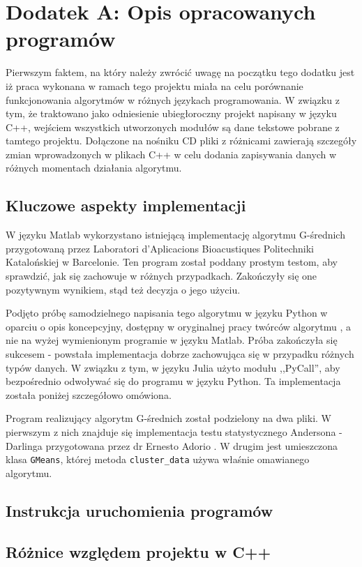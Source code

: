 \section*{Dodatek A: Opis opracowanych programów}

\qquad Pierwszym faktem, na który należy zwrócić uwagę na początku tego dodatku jest iż praca wykonana w ramach tego projektu miała na celu porównanie funkcjonowania algorytmów w różnych językach programowania. W związku z tym, że traktowano jako odniesienie ubiegłoroczny projekt napisany w języku C++, wejściem wszystkich utworzonych modułów są dane tekstowe pobrane z tamtego projektu. Dołączone na nośniku CD pliki z różnicami zawierają szczegóły zmian wprowadzonych w plikach C++ w celu dodania zapisywania danych w różnych momentach działania algorytmu.

\subsection{Kluczowe aspekty implementacji}

\qquad W języku Matlab wykorzystano istniejącą implementację algorytmu G-średnich przygotowaną przez Laboratori d'Aplicacions Bioacustiques Politechniki Katalońskiej w Barcelonie. Ten program został poddany prostym testom, aby sprawdzić, jak się zachowuje w różnych przypadkach. Zakończyły się one pozytywnym wynikiem, stąd też decyzja o jego użyciu.

Podjęto próbę samodzielnego napisania tego algorytmu w języku Python w oparciu o opis koncepcyjny, dostępny w oryginalnej pracy twórców algorytmu \cite{GMeans}, a nie na wyżej wymienionym programie w języku Matlab. Próba zakończyła się sukcesem - powstała implementacja dobrze zachowująca się w przypadku różnych typów danych. W związku z tym, w języku Julia użyto modułu ,,PyCall'', aby bezpośrednio odwoływać się do programu w języku Python. Ta implementacja została poniżej szczegółowo omówiona.

Program realizujący algorytm G-średnich został podzielony na dwa pliki. W pierwszym z nich znajduje się implementacja testu statystycznego Andersona - Darlinga przygotowana przez dr Ernesto Adorio \cite{ad-test-python}. W drugim jest umieszczona klasa \texttt{GMeans}, której metoda \texttt{cluster\_data} używa właśnie omawianego algorytmu. 

\subsection{Instrukcja uruchomienia programów}

\subsection{Różnice względem projektu w C++}
